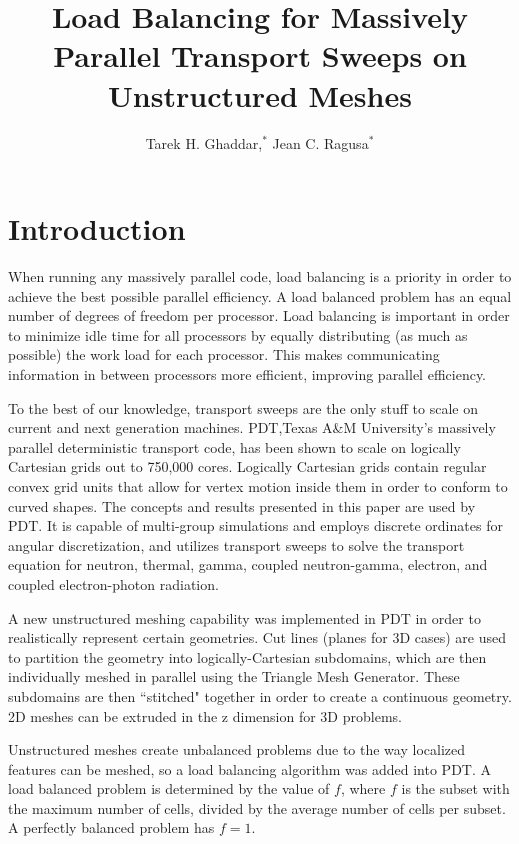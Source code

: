\documentclass{anstrans}
\title{Load Balancing for Massively Parallel Transport Sweeps on Unstructured Meshes }
\author{Tarek H. Ghaddar,$^{*}$ Jean C. Ragusa$^{*}$}
\institute{
$^{*}$Dept. of Nuclear Engineering, Texas A\&M University, College Station, TX, 77843-3133
\and

}
\begin{document}
\section{Introduction}
\label{ch:introduction}
When running any massively parallel code, load balancing is a priority in order to achieve the best possible parallel efficiency. A load balanced problem has an equal number of degrees of freedom per processor. Load balancing is important in order to minimize idle time for all processors by equally distributing (as much as possible) the work load for each processor. This makes communicating information in between processors more efficient, improving parallel efficiency. 

To the best of our knowledge, transport sweeps are the only stuff to scale on current and next generation machines. PDT,Texas A\&M University's massively parallel deterministic transport code, has been shown to scale on logically Cartesian grids out to 750,000 cores\cite{mpadams2015}. Logically Cartesian grids contain regular convex grid units that allow for vertex motion inside them in order to conform to curved shapes. The concepts and results presented in this paper are used by PDT. It is capable of multi-group simulations and employs discrete ordinates for angular discretization, and utilizes transport sweeps to solve the transport equation for neutron, thermal, gamma, coupled neutron-gamma, electron, and coupled electron-photon radiation.

A new unstructured meshing capability was implemented in PDT in order to realistically represent certain geometries. Cut lines (planes for 3D cases) are used to partition the geometry into logically-Cartesian subdomains, which are then individually meshed in parallel using the Triangle Mesh Generator\cite{triangle}. These subdomains are then ``stitched" together in order to create a continuous geometry. 2D meshes can be extruded in the z dimension for 3D problems. 

Unstructured meshes create unbalanced problems due to the way localized features can be meshed, so a load balancing algorithm was added into PDT. A load balanced problem is determined by the value of $f$, where $f$ is the subset with the maximum number of cells, divided by the average number of cells per subset. A perfectly balanced problem has $f = 1$.


\end{document}
